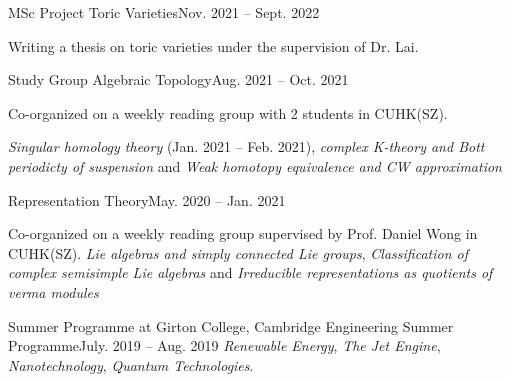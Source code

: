 \resumeSubHeadingListStart
	\resumeSubheading
		{MSc Project}{}
		{Toric Varieties}{Nov. 2021 -- Sept. 2022}
		\resumeItemListStart
			\item{Writing a thesis on toric varieties under the supervision of Dr. Lai.} %
		\resumeItemListEnd

	\resumeSubheading
		{Study Group}{}
		{Algebraic Topology}{Aug. 2021 -- Oct. 2021}
		\resumeItemListStart
			\item Co-organized on a weekly reading group with 2 students in CUHK(SZ). \par
				{\textit{Singular homology theory} (Jan. 2021 -- Feb. 2021), \textit{complex K-theory and Bott periodicty of suspension} and \textit{Weak homotopy equivalence and CW approximation}}
		\resumeItemListEnd
		
		\resumeSubSubheading
			{Representation Theory}{May. 2020 -- Jan. 2021}
			\resumeItemListStart
				\item Co-organized on a weekly reading group supervised by Prof. Daniel Wong in CUHK(SZ).
					{\textit{Lie algebras and simply connected Lie groups}, \textit{Classification of complex semisimple Lie algebras} and \textit{Irreducible representations as quotients of verma modules}}
			\resumeItemListEnd

	\resumeSubheading
		{Summer Programme at Girton College, Cambridge}{}
		{Engineering Summer Programme}{July. 2019 -- Aug. 2019}
		\resumeItemListStart
				{\textit{Renewable Energy}, \textit{The Jet Engine}, \textit{Nanotechnology}, \textit{Quantum Technologies}.}
		\resumeItemListEnd
		
\resumeSubHeadingListEnd

